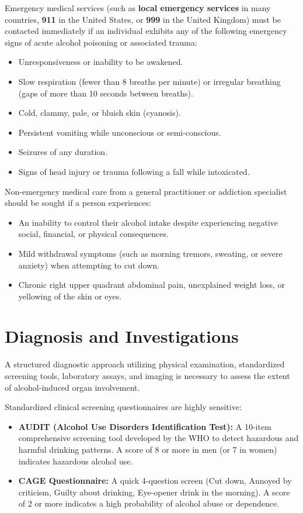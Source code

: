 Emergency medical services (such as \textbf{local emergency services} in many countries, \textbf{911} in the United States, or \textbf{999} in the United Kingdom) must be contacted immediately if an individual exhibits any of the following emergency signs of acute alcohol poisoning or associated trauma:
\begin{itemize}
    \item Unresponsiveness or inability to be awakened.
    \item Slow respiration (fewer than 8 breaths per minute) or irregular breathing (gaps of more than 10 seconds between breaths).
    \item Cold, clammy, pale, or bluish skin (cyanosis).
    \item Persistent vomiting while unconscious or semi-conscious.
    \item Seizures of any duration.
    \item Signs of head injury or trauma following a fall while intoxicated.
\end{itemize}

Non-emergency medical care from a general practitioner or addiction specialist should be sought if a person experiences:
\begin{itemize}
    \item An inability to control their alcohol intake despite experiencing negative social, financial, or physical consequences.
    \item Mild withdrawal symptoms (such as morning tremors, sweating, or severe anxiety) when attempting to cut down.
    \item Chronic right upper quadrant abdominal pain, unexplained weight loss, or yellowing of the skin or eyes.
\end{itemize}

\section*{Diagnosis and Investigations}
A structured diagnostic approach utilizing physical examination, standardized screening tools, laboratory assays, and imaging is necessary to assess the extent of alcohol-induced organ involvement.

Standardized clinical screening questionnaires are highly sensitive:
\begin{itemize}
    \item \textbf{AUDIT (Alcohol Use Disorders Identification Test):} A 10-item comprehensive screening tool developed by the WHO to detect hazardous and harmful drinking patterns. A score of 8 or more in men (or 7 in women) indicates hazardous alcohol use.
    \item \textbf{CAGE Questionnaire:} A quick 4-question screen (Cut down, Annoyed by criticism, Guilty about drinking, Eye-opener drink in the morning). A score of 2 or more indicates a high probability of alcohol abuse or dependence.
\end{itemize}


